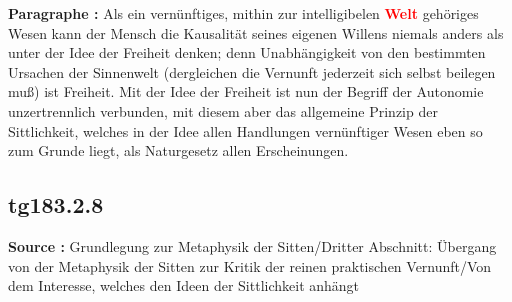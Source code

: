 \documentclass[a4paper,12pt,twoside]{book}
\newcommand{\match}[1]{\textcolor{red}{\textbf{#1}}}
\begin{document}
	\noindent\textbf{Paragraphe : }Als ein vernünftiges, mithin zur intelligibelen \match{Welt} gehöriges Wesen kann der Mensch die Kausalität seines eigenen Willens niemals anders als unter der Idee der Freiheit denken; denn Unabhängigkeit von den bestimmten Ursachen der Sinnenwelt (dergleichen die Vernunft jederzeit sich selbst beilegen muß) ist Freiheit. Mit der Idee der Freiheit ist nun  der Begriff der Autonomie unzertrennlich verbunden, mit diesem aber das allgemeine Prinzip der Sittlichkeit, welches in der Idee allen Handlungen vernünftiger Wesen eben so zum Grunde liegt, als Naturgesetz allen Erscheinungen. 
	
	\subsection*{tg183.2.8} 
	\textbf{Source : }Grundlegung zur Metaphysik der Sitten/Dritter Abschnitt: Übergang von der Metaphysik der Sitten zur Kritik der reinen praktischen Vernunft/Von dem Interesse, welches den Ideen der Sittlichkeit anhängt\\  
	
\end{document}
